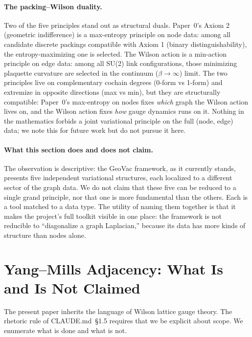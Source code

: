\documentclass[11pt]{article}
\begin{document}
\paragraph*{The packing--Wilson duality.}
Two of the five principles stand out as structural duals.  Paper~0's
Axiom 2 (geometric indifference) is a max-entropy principle on node
data: among all candidate discrete packings compatible with Axiom 1
(binary distinguishability), the entropy-maximizing one is selected.
The Wilson action is a min-action principle on edge data: among all
SU(2) link configurations, those minimizing plaquette curvature are
selected in the continuum ($\beta \to \infty$) limit.  The two
principles live on complementary cochain degrees (0-form vs 1-form)
and extremize in opposite directions (max vs min), but they are
structurally compatible: Paper~0's max-entropy on nodes fixes
\emph{which} graph the Wilson action lives on, and the Wilson action
fixes \emph{how} gauge dynamics runs on it.  Nothing in the
mathematics forbids a joint variational principle on the full
(node, edge) data; we note this for future work but do not pursue it
here.

\paragraph*{What this section does and does not claim.}
The observation is descriptive: the GeoVac framework, as it currently
stands, presents five independent variational structures, each
localized to a different sector of the graph data.  We do not claim
that these five can be reduced to a single grand principle, nor that
one is more fundamental than the others.  Each is a tool matched to a
data type.  The utility of naming them together is that it makes the
project's full toolkit visible in one place: the framework is not
reducible to ``diagonalize a graph Laplacian,'' because its data has
more kinds of structure than nodes alone.

\section{Yang--Mills Adjacency: What Is and Is Not Claimed}
\label{sec:scope}

The present paper inherits the language of Wilson lattice gauge theory.
The rhetoric rule of CLAUDE.md~\S1.5 requires that we be explicit about
scope.  We enumerate what is done and what is not.
\end{document}
